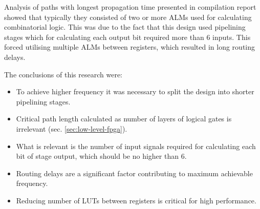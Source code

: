 Analysis of paths with longest propagation time presented in compilation report showed that typically they consisted of two or more ALMs used for calculating combinatorial logic. This was due to the fact that this design used pipelining stages which for calculating each output bit required more than 6 inputs. This forced utilising multiple ALMs between registers, which resulted in long routing delays.

The conclusions of this research were:
\begin{itemize}
\item To achieve higher frequency it was necessary to split the design into shorter pipelining stages.
\item Critical path length calculated as number of layers of logical gates is irrelevant (sec. \ref{sec:low-level-fpga}).
\item What is relevant is the number of input signals required for calculating each bit of stage output, which should be no higher than 6.
\item Routing delays are a significant factor contributing to maximum achievable frequency.
\item Reducing number of LUTs between registers is critical for high performance.
\end{itemize}






